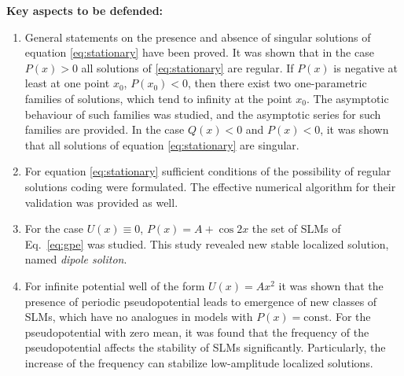 \documentclass[candidate, href, colorlinks]{disser}
\begin{document}
\textbf{Key aspects to be defended:}
\begin{enumerate}
	\item General statements on the presence and absence of singular solutions of equation \eqref{eq:stationary} have been proved.
		It was shown that in the case $P(x) > 0$ all solutions of \eqref{eq:stationary} are regular.
		If $P(x)$ is negative at least at one point $x_0$, $P(x_0) < 0$, then there exist two one-parametric families of solutions, which tend to infinity at the point $x_0$.
		The asymptotic behaviour of such families was studied, and the asymptotic series for such families are provided.
		In the case $Q(x) < 0$ and $P(x) < 0$, it was shown that all solutions of equation \eqref{eq:stationary} are singular.
	\item For equation \eqref{eq:stationary} sufficient conditions of the possibility of regular solutions coding were formulated.
		The effective numerical algorithm for their validation was provided as well.
	\item For the case $U(x) \equiv 0$, $P(x) = A + \cos 2x$ the set of SLMs of Eq.~\eqref{eq:gpe} was studied.
		This study revealed new stable localized solution, named {\it dipole soliton}.
	\item For infinite potential well of the form $U(x) = A x^2$ it was shown that the presence of periodic pseudopotential leads to emergence of new classes of SLMs, which have no analogues in models with $P(x) = \mathrm{const}$.
		For the pseudopotential with zero mean, it was found that the frequency of the pseudopotential affects the stability of SLMs significantly.
		Particularly, the increase of the frequency can stabilize low-amplitude localized solutions.
\end{enumerate}
\end{document}
